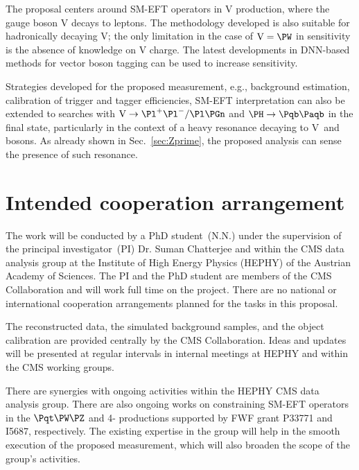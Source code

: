 \documentclass[a4paper,11pt]{article}
\newcommand{\Pb}{{{\Pqb}}\xspace}
\newcommand{\Pt}{{{\Pqt}}\xspace}
\newcommand{\PAb}{{{{\Paqb}}}\xspace}
\newcommand{\PAt}{{{{\Paqt}}}\xspace}
\renewcommand{\PV}{{{{V}}}\xspace}
\newcommand{\VH}{{{\PV}{\PH}}\xspace}
\begin{document}
The proposal centers around SM-EFT operators in \VH production, where the gauge boson \PV decays to leptons. 
The methodology developed is also suitable for hadronically decaying \PV; 
the only limitation in the case of $\textrm{\PV}={\PW}$ in sensitivity is the absence of knowledge on \PV charge. 
The latest developments in DNN-based methods for vector boson tagging can be used to increase sensitivity. 

Strategies developed for the proposed measurement, e.g., background estimation, calibration of trigger and \PH tagger efficiencies, SM-EFT interpretation can also be extended to searches with $\textrm{\PV}\rightarrow \Pl^{+}\Pl^{-} / \Pl \Pgn$ and $\PH \to \Pb \PAb$ in the final state, particularly in the context of a heavy resonance decaying to \PV~and~{\PH} bosons. 
As already shown in Sec.~\ref{sec:Zprime}, the proposed analysis can sense the presence of such resonance. 


\section{Intended cooperation arrangement} 

The work will be conducted by a PhD student~(N.N.) under the supervision of the principal investigator~(PI) Dr. Suman Chatterjee and within the  CMS data analysis group at the Institute of High Energy Physics (HEPHY) of the Austrian Academy of Sciences. The PI and the PhD student are members of the CMS Collaboration and will work full time on the project. 
There are no national or international cooperation arrangements planned for the tasks in this proposal.

The reconstructed data, the simulated background samples, and the object calibration are provided centrally by the CMS Collaboration. 
Ideas and updates will be presented at regular intervals in internal meetings at HEPHY and within the CMS working groups. 

There are synergies with ongoing activities within the HEPHY CMS data analysis group.
There are also ongoing works on constraining SM-EFT operators in the $\Pt\PW\PZ$ and 4-\Pt productions supported by FWF grant P33771 and I5687, respectively. 
The existing expertise in the group will help in the smooth execution of the proposed measurement, which will also broaden the scope of the group's activities.
\end{document}

